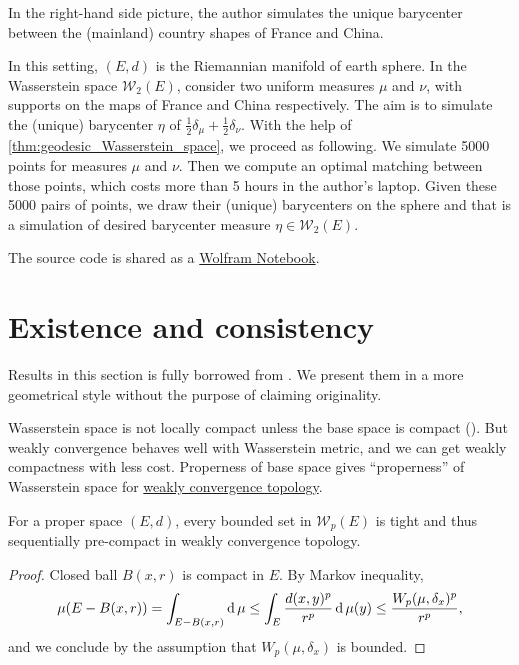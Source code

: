 In the right-hand side picture,
the author simulates the unique barycenter between the (mainland) country shapes of France and China.

\begin{example}
	\label{example:barycenter_sphere}
	In this setting, $(E, d)$ is the Riemannian manifold of earth sphere.
	In the Wasserstein space $\mathcal{W}_2(E)$, consider two uniform measures $\mu$ and $\nu$,
	with supports on the maps of France and China respectively.
	The aim is to simulate the (unique) barycenter $\eta$ of $\frac{1}{2}\delta_\mu + \frac{1}{2}\delta_\nu$.
	With the help of \cref{thm:geodesic_Wasserstein_space}, we proceed as following.
	We simulate 5000 points for measures $\mu$ and $\nu$.
	Then we compute an optimal matching between those points,
	which costs more than 5 hours in the author's laptop.
	Given these 5000 pairs of points,
	we draw their (unique) barycenters on the sphere and that is a simulation of desired barycenter measure $\eta \in \mathcal{W}_2(E)$.
\end{example}

The source code is shared as a \href{https://www.wolframcloud.com/obj/jingmatrix/Published/OPT_sphere_country.nb}{Wolfram Notebook}.

\section{Existence and consistency}

Results in this section is fully borrowed from \cite{le2017existence}.
We present them in a more geometrical style without the purpose of claiming originality.

Wasserstein space is not locally compact unless the base space is compact (\cite[Remark 7.1.9]{Ambrosio2005}).
But weakly convergence behaves well with Wasserstein metric, and we can get weakly compactness with less cost.
Properness of base space gives ``properness'' of Wasserstein space for \underline{weakly convergence topology}.

\begin{prop}
	\label{prop:proper_weakly_convergence_topology}
	For a proper space $(E,d)$,
	every bounded set in $\mathcal{W}_p(E)$ is tight and thus
	sequentially	pre-compact in weakly convergence topology.
\end{prop}

\begin{proof}
	Closed ball $B(x,r)$ is compact in $E$.
	By Markov inequality,
	\[
		\mu(E - B(x,r)) = \int_{E - B(x,r)} \operatorname{d} \mu \leq
		\int_{E} \frac{d(x, y)^p}{r^p} \operatorname{d} \mu(y) \leq  \frac{W_p(\mu, \delta_x)^p}{r^p},
	\]
	and we conclude by the assumption that $W_p( \mu, \delta_x)$ is bounded.
\end{proof}

